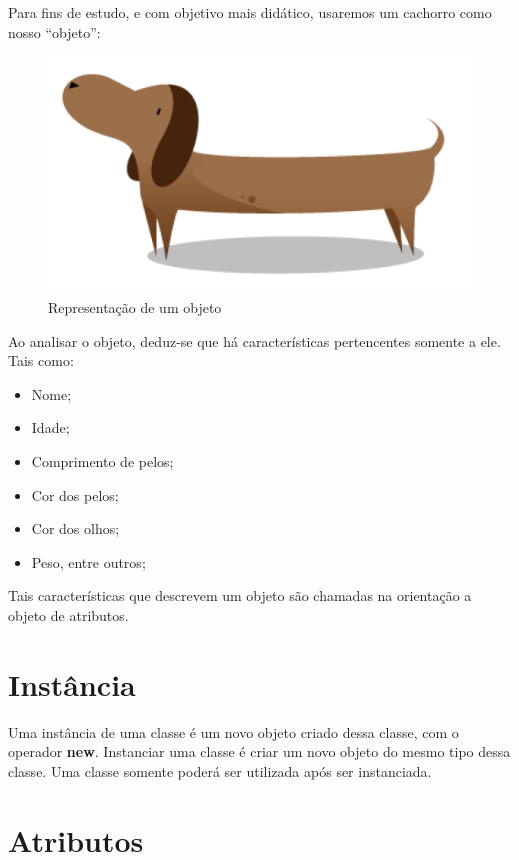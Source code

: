 Para fins de estudo, e com objetivo mais didático, usaremos um cachorro como 
nosso ``objeto'':

\begin{figure}[H]
  \centering
  \includegraphics[scale=0.4]{imagens/cachorro-objeto.png}
  \caption{Representação de um objeto}
  \label{fig:cachorro-objeto}
\end{figure}

Ao analisar o objeto, deduz-se que há características pertencentes somente a 
ele. Tais como:

\begin{itemize}
  \item Nome;
  \item Idade;
  \item Comprimento de pelos;
  \item Cor dos pelos;
  \item Cor dos olhos;
  \item Peso, entre outros;
\end{itemize}

Tais características que descrevem um objeto são chamadas na orientação a 
objeto de atributos.

\section{Instância}

Uma instância de uma classe é um novo objeto criado dessa classe, com o operador \textbf{new}. Instanciar uma classe é criar um novo objeto do mesmo tipo dessa classe. Uma classe somente poderá ser utilizada após ser instanciada.

\section{Atributos}

